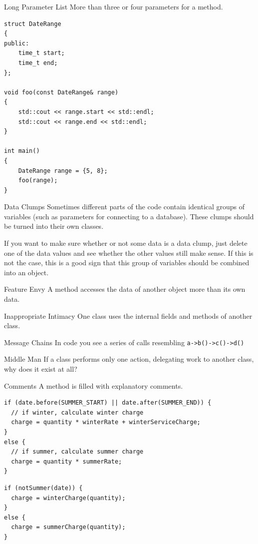 \documentclass{beamer}
\begin{document}
\begin{frame}[fragile]{Long Parameter List}
More than three or four parameters for a method.
\begin{lstlisting}
struct DateRange
{
public:
    time_t start;
    time_t end;
};

void foo(const DateRange& range)
{
    std::cout << range.start << std::endl;
    std::cout << range.end << std::endl;
}

int main()
{
    DateRange range = {5, 8};
    foo(range);
}
\end{lstlisting}
\end{frame}

\begin{frame}{Data Clumps}
Sometimes different parts of the code contain identical groups of variables
(such as parameters for connecting to a database). These clumps should be turned
into their own classes. 

If you want to make sure whether or not some data is a data clump, just delete
one of the data values and see whether the other values still make sense. If
this is not the case, this is a good sign that this group of variables should be
combined into an object.
\end{frame}

\begin{frame}{Feature Envy}
A method accesses the data of another object more than its own data.
\end{frame}

\begin{frame}{Inappropriate Intimacy}
One class uses the internal fields and methods of another class.
\end{frame}

\begin{frame}{Message Chains}
In code you see a series of calls resembling \lstinline{a->b()->c()->d()}
\end{frame}

\begin{frame}{Middle Man}
If a class performs only one action, delegating work to another class, why does
it exist at all?
\end{frame}

\begin{frame}[fragile]{Comments}
A method is filled with explanatory comments.
\begin{lstlisting}
if (date.before(SUMMER_START) || date.after(SUMMER_END)) {
  // if winter, calculate winter charge
  charge = quantity * winterRate + winterServiceCharge;
}
else {
  // if summer, calculate summer charge
  charge = quantity * summerRate;
}
\end{lstlisting}

\begin{lstlisting}
if (notSummer(date)) {
  charge = winterCharge(quantity);
}
else {
  charge = summerCharge(quantity);
}
\end{lstlisting}
\end{frame}
\end{document}
